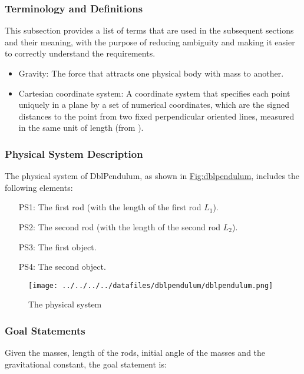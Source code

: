 \documentclass[12pt]{article}
\begin{document}
\subsubsection{Terminology and Definitions}
\label{Sec:TermDefs}
This subsection provides a list of terms that are used in the subsequent sections and their meaning, with the purpose of reducing ambiguity and making it easier to correctly understand the requirements.

\begin{itemize}
\item{Gravity: The force that attracts one physical body with mass to another.}
\item{Cartesian coordinate system: A coordinate system that specifies each point uniquely in a plane by a set of numerical coordinates, which are the signed distances to the point from two fixed perpendicular oriented lines, measured in the same unit of length (from \cite{cartesianWiki}).}
\end{itemize}
\subsubsection{Physical System Description}
\label{Sec:PhysSyst}
The physical system of DblPendulum, as shown in \hyperref[Figure:dblpendulum]{Fig:dblpendulum}, includes the following elements:

\begin{itemize}
\item[PS1:]{The first rod (with the length of the first rod ${L_{1}}$).}
\item[PS2:]{The second rod (with the length of the second rod ${L_{2}}$).}
\item[PS3:]{The first object.}
\item[PS4:]{The second object.}
\end{itemize}
\begin{figure}
\begin{center}
\texttt{[image: ../../../../datafiles/dblpendulum/dblpendulum.png]}
\caption{The physical system}
\label{Figure:dblpendulum}
\end{center}
\end{figure}
\subsubsection{Goal Statements}
\label{Sec:GoalStmt}
Given the masses, length of the rods, initial angle of the masses and the gravitational constant, the goal statement is:
\end{document}
